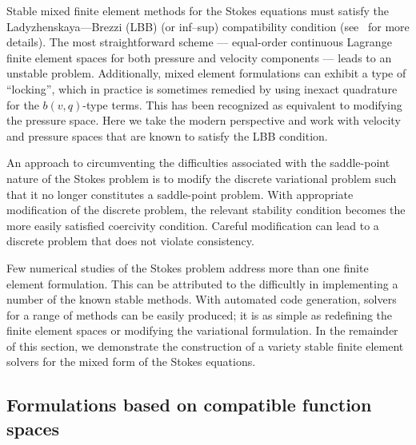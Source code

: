 Stable mixed finite element methods for the Stokes equations must satisfy
the Ladyzhenskaya--\babuska--Brezzi (LBB) (or inf--sup) compatibility
condition (see~\citet{BrezziFortin1991} for more details).  The most
straightforward scheme --- equal-order continuous Lagrange finite element
spaces for both pressure and velocity components --- leads to an unstable
problem.  Additionally, mixed element formulations can exhibit a type of
``locking'', which in practice is sometimes remedied by using inexact
quadrature for the $b(v, q)$-type terms.  This has been recognized as
equivalent to modifying the pressure space.  Here we take the modern
perspective and work with velocity and pressure spaces that are known
to satisfy the LBB condition.

An approach to circumventing the difficulties associated with the
saddle-point nature of the Stokes problem is to modify the discrete
variational problem such that it no longer constitutes a saddle-point
problem. With appropriate modification of the discrete problem, the
relevant stability condition becomes the more easily satisfied coercivity
condition. Careful modification can lead to a discrete problem that does
not violate consistency.

Few numerical studies of the Stokes problem address more than one
finite element formulation. This can be attributed to the difficultly
in implementing a number of the known stable methods. With automated
code generation, solvers for a range of methods can be easily produced;
it is as simple as redefining the finite element spaces or modifying
the variational formulation.  In the remainder of this section, we
demonstrate the construction of a variety stable finite element solvers
for the mixed form of the Stokes equations.

\subsection{Formulations based on compatible function spaces}

